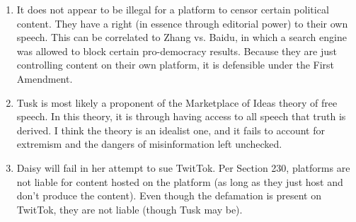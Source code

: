 \documentclass{article}
\begin{document}
\bigskip
\begin{mdframed}
\begin{enumerate}[label=\Alph*.]
\item It does not appear to be illegal for a platform to censor certain political content. They have a right (in essence through editorial power) to their own speech. This can be correlated to Zhang vs. Baidu, in which a search engine was allowed to block certain pro-democracy results. Because they are just controlling content on their own platform, it is defensible under the First Amendment.
\item Tusk is most likely a proponent of the Marketplace of Ideas theory of free speech. In this theory, it is through having access to all speech that truth is derived. I think the theory is an idealist one, and it fails to account for extremism and the dangers of misinformation left unchecked.
\item Daisy will fail in her attempt to sue TwitTok. Per Section 230, platforms are not liable for content hosted on the platform (as long as they just host and don't produce the content). Even though the defamation is present on TwitTok, they are not liable (though Tusk may be).
\end{enumerate}
\end{mdframed}
\bigskip

\bigskip
\end{document}
